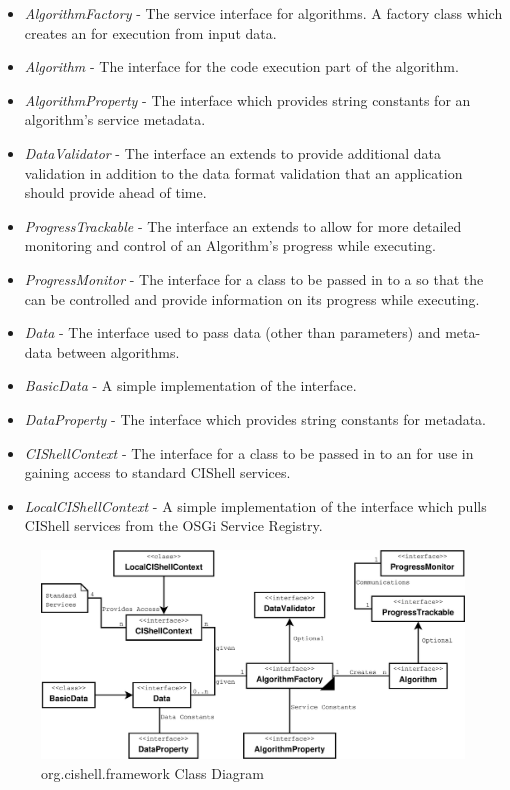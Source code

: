 \begin{itemize}
  \item \textit{AlgorithmFactory} - The service interface for algorithms.
  A factory class which creates an  for execution from input
  data.
  \item \textit{Algorithm} - The interface for the code execution part of the
  algorithm.
  \item \textit{AlgorithmProperty} - The interface which provides string
  constants for an algorithm's service metadata.
  \item \textit{DataValidator} - The interface an 
  extends to provide additional data validation in addition to the data format validation
  that an application should provide ahead of time.
  \item \textit{ProgressTrackable} - The interface an  extends
  to allow for more detailed monitoring and control of an Algorithm's progress while
  executing.
  \item \textit{ProgressMonitor} - The interface for a class to be passed in to
  a   so that the 
  can be controlled and provide information on its progress while executing.
  \item \textit{Data} - The interface used to pass data (other than
  parameters) and meta-data between algorithms.
  \item \textit{BasicData} - A simple implementation of the 
  interface.
  \item \textit{DataProperty} - The interface which provides string constants
  for  metadata.
  \item \textit{CIShellContext} - The interface for a class to be passed in to
  an  for use in gaining access to standard CIShell
  services.
  \item \textit{LocalCIShellContext} - A simple implementation of the
   interface which pulls CIShell services from the OSGi
  Service Registry.
\end{itemize}

\begin{figure}[htb!]
\centering
\includegraphics[width=150mm]{../img/cishellInteraction.pdf}
\caption{org.cishell.framework Class Diagram}
\label{fig:cishellInteraction}
\end{figure}

